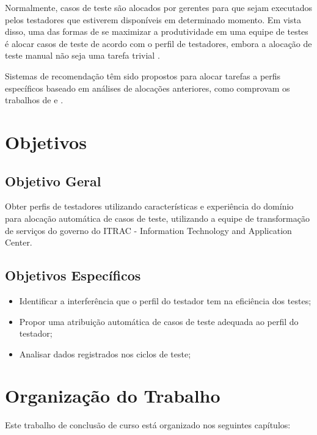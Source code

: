Normalmente, casos de teste são alocados por gerentes para que sejam executados pelos testadores que estiverem disponíveis em 
determinado momento. Em vista disso, uma das formas de se maximizar a produtividade em uma equipe de testes é alocar casos de teste de acordo com o 
perfil de testadores, embora a alocação de teste manual não seja uma tarefa trivial \cite{miranda2012recommender}.

Sistemas de recomendação têm sido propostos para alocar tarefas a perfis específicos baseado em análises de alocações anteriores, como 
comprovam os trabalhos de \cite{anvik2006should} e \cite{miranda2012recommender}.


\section{Objetivos}
\subsection{Objetivo Geral}

Obter perfis de testadores utilizando características e experiência do domínio para alocação automática de casos de teste,
utilizando a equipe de transformação de serviços do governo do ITRAC - Information Technology and Application Center.

\subsection{Objetivos Específicos}

\begin{itemize}
		\item Identificar a interferência que o perfil do testador tem na eficiência dos testes;
		\item Propor uma atribuição automática de casos de teste adequada ao perfil do testador; 
		\item Analisar dados registrados nos ciclos de teste;
	\end{itemize}

\section{Organização do Trabalho}

Este trabalho de conclusão de curso está organizado nos seguintes capítulos:

